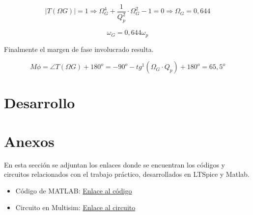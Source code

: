 \documentclass[12pt,A4paper,titlepage]{article}
\begin{document}
\begin{equation}
    |T(\Omega G)| = 1 \Longrightarrow \Omega _G ^4 + \frac{1}{Q_p^2} \cdot \Omega_G^2 - 1 = 0 \Longrightarrow \Omega _G = 0,644
\end{equation}

\begin{equation}
    \omega _G = 0,644 \omega _p
\end{equation}

\bigskip
\hspace{1mm} Finalmente el margen de fase involucrado resulta.

\begin{equation}
    M \phi = \angle T(\Omega G) + 180 ^o = -90^o - tg^1 ( \Omega _G \cdot Q_p) + 180^o = 65,5^o 
\end{equation}
\newpage
\section{Desarrollo}

\newpage

\newpage

\newpage
\section{Anexos}
\hspace{1mm} En esta sección se adjuntan los enlaces donde se encuentran los códigos y circuitos relacionados con el trabajo práctico, desarrollados en LTSpice y Matlab.

\begin{itemize}
  \item Código de MATLAB: \href{https://drive.google.com/drive/u/1/folders/1tMhJg05OBsu2jBb_01hIpFwt4gK68p9m}{Enlace al código}
    \item Circuito en Multisim: \href{https://drive.google.com/drive/u/1/folders/1RTTx1D0vFVLO-MP1Zpwf79zagK8-XdSH}{Enlace al circuito}
\end{itemize}
\end{document}
